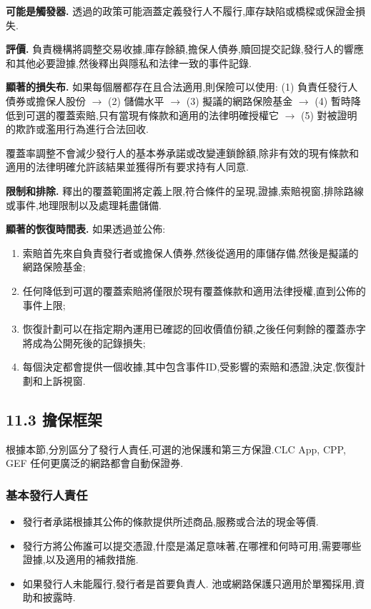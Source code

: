 \documentclass[11pt]{article}
\begin{document}
\textbf{可能是觸發器.} 透過的政策可能涵蓋定義發行人不履行,庫存缺陷或橋樑或保證金損失.

\textbf{評價.} 負責機構將調整交易收據,庫存餘額,擔保人債券,贖回提交記錄,發行人的響應和其他必要證據,然後釋出與隱私和法律一致的事件記錄.

\textbf{顯著的損失布.} 如果每個層都存在且合法適用,則保險可以使用: (1) 負責任發行人債券或擔保人股份 $\to$ (2) 儲備水平 $\to$ (3) 擬議的網路保險基金 $\to$ (4) 暫時降低到可選的覆蓋索賠,只有當現有條款和適用的法律明確授權它 $\to$ (5) 對被證明的欺詐或濫用行為進行合法回收.

覆蓋率調整不會減少發行人的基本券承諾或改變連鎖餘額,除非有效的現有條款和適用的法律明確允許該結果並獲得所有要求持有人同意.

\textbf{限制和排除.} 釋出的覆蓋範圍將定義上限,符合條件的呈現,證據,索賠視窗,排除路線或事件,地理限制以及處理耗盡儲備.

\textbf{顯著的恢復時間表.} 如果透過並公佈:

\begin{enumerate}[leftmargin=*]
\item 索賠首先來自負責發行者或擔保人債券,然後從適用的庫儲存備,然後是擬議的網路保險基金;
\item 任何降低到可選的覆蓋索賠將僅限於現有覆蓋條款和適用法律授權,直到公佈的事件上限;
\item 恢復計劃可以在指定期內運用已確認的回收價值份額,之後任何剩餘的覆蓋赤字將成為公開死後的記錄損失;
\item 每個決定都會提供一個收據,其中包含事件ID,受影響的索賠和憑證,決定,恢復計劃和上訴視窗.
\end{enumerate}
\subsection*{11.3 擔保框架}

根據本節,分別區分了發行人責任,可選的池保護和第三方保證.CLC App, CPP, GEF 任何更廣泛的網路都會自動保證券.

\subsubsection*{基本發行人責任}

\begin{itemize}[leftmargin=*]
\item 發行者承諾根據其公佈的條款提供所述商品,服務或合法的現金等價.
\item 發行方將公佈誰可以提交憑證,什麼是滿足意味著,在哪裡和何時可用,需要哪些證據,以及適用的補救措施.
\item 如果發行人未能履行,發行者是首要負責人. 池或網路保護只適用於單獨採用,資助和披露時.
\end{itemize}
\end{document}
